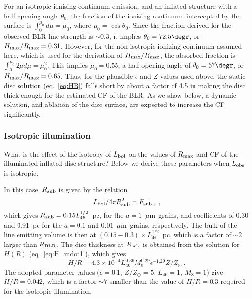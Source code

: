 \documentclass[a4paper,fleqn,usenatbib]{mnras}
\newcommand{\mic}{\mbox{$\mu$m}}
\begin{document}
For an isotropic ionising continuum emission, and an inflated structure with a half opening angle
$\theta_0$, the fraction of the ionising continuum intercepted by the surface is 
$\int_0^{\mu_0}d\mu=\mu_0$, where $\mu_0=\cos\theta_0$. Since the fraction derived for 
the observed BLR line strength is $\sim 0.3$, 
it implies $\theta_0=72.5\degr$, or $H_{\rm max}/R_{\rm max}=0.31$. However, for the 
non-isotropic ionizing continuum assumed here, which is used for the derivation of $H_{\rm max}/R_{\rm max}$,
the absorbed fraction is $\int_0^{\mu_0}2\mu d\mu=\mu_0^2$. This implies $\mu_0=0.55$,
a half opening angle of $\theta_0=57\degr$, or $H_{\rm max}/R_{\rm max}=0.65$.
Thus, for the plausible $\epsilon$ and $Z$ values used above, the static disc solution (eq.~\ref{eq:HR}) 
falls short by about a factor of 4.5 in making the disc thick enough for the estimated CF of the BLR. As we show below, a dynamic solution, and ablation of the disc surface,
are expected to increase the CF significantly.



\subsubsection{Isotropic illumination}

What is the effect of the isotropy of $L_{\rm bol}$ on the values of $R_{\rm max}$ and CF of the illuminated inflated disc structure? Below we derive these parameters when $L_{\rm obs}$ is isotropic.

In this case, $R_{\rm sub}$ is given by the relation
\begin{equation}
L_{\rm bol}/4\pi R_{\rm sub}^2=F_{\rm sub, a}\ , 
\end{equation}
which gives $R_{\rm sub}=0.15L_{46}^{1/2}$~pc, for
the $a=1$~\mic\ grains, and coefficients of 0.30 and 0.91~pc for the $a=0.1$ and $0.01$~\mic\ grains, respectively.
The bulk of the line emitting volume is then at $(0.15-0.3)\times L_{46}^{1/2}$~pc, which is
a factor of $\sim 2$ larger than $R_{\rm BLR}$. The disc thickness at $R_{\rm sub}$ 
is obtained from the  solution for $H(R)$ (eq.~\ref{eq:H_mdot1}), 
which gives
\begin{equation}
  H/R=4.3\times 10^{-4}L_{46}^{0.36}M_8^{0.29}\epsilon^{-1.29}Z/Z_{\odot}\ .
\end{equation}
The adopted parameter values ($\epsilon=0.1$, $Z/Z_{\odot}=5$, $L_{46}=1$, $M_8=1$) give
$H/R=0.042$, which is a factor $\sim 7$ smaller than the value of $H/R=0.3$ required for the isotropic illumination.
\end{document}
